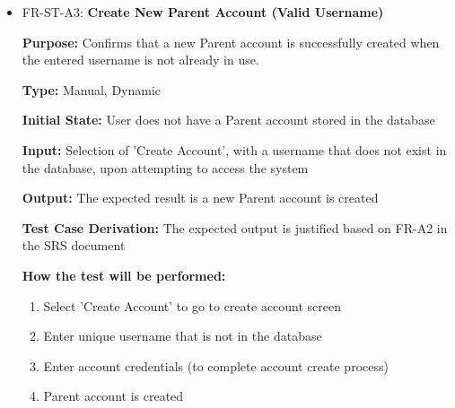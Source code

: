 \documentclass[12pt, titlepage]{article}
\begin{document}
\begin{itemize}
  \item FR-ST-A3: \textbf{Create New Parent Account (Valid Username)}
  \begin{mdframed}[linewidth=0.5mm]
      \textbf{Purpose:} Confirms that a new Parent account is successfully created when the entered username is not already in use. \par
      \textbf{Type:} Manual, Dynamic \par
      \textbf{Initial State:} User does not have a Parent account stored in the database \par
      \textbf{Input:} Selection of 'Create Account', with a username that does not exist in the database, upon attempting to access the system \par
      \textbf{Output:} The expected result is a new Parent account is created \par
      \textbf{Test Case Derivation:} The expected output is justified based on FR-A2 in the SRS document \par
      \textbf{How the test will be performed:}
      \begin{enumerate}[noitemsep]
        \item Select 'Create Account' to go to create account screen
        \item Enter unique username that is not in the database
        \item Enter account credentials (to complete account create process)
        \item Parent account is created
      \end{enumerate}
  \end{mdframed}


\end{itemize}
\end{document}
